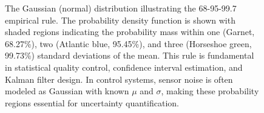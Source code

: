\begin{figure}[htbp]
\caption{The Gaussian (normal) distribution illustrating the 68-95-99.7 empirical rule. The probability density function is shown with shaded regions indicating the probability mass within one (Garnet, 68.27\%), two (Atlantic blue, 95.45\%), and three (Horseshoe green, 99.73\%) standard deviations of the mean. This rule is fundamental in statistical quality control, confidence interval estimation, and Kalman filter design. In control systems, sensor noise is often modeled as Gaussian with known $\mu$ and $\sigma$, making these probability regions essential for uncertainty quantification.}
\label{fig:normal_curve}
\end{figure}
